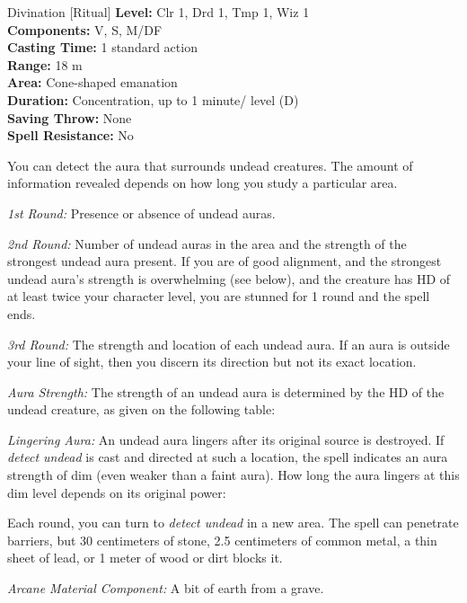 {Divination [Ritual]}
{
	\textbf{Level:}
	Clr 1, Drd 1, Tmp 1, Wiz 1\\
	\textbf{Components:}
	V, S, M/DF\\
	\textbf{Casting Time:}
	1 standard action\\
	\textbf{Range:}
	18 m\\
	\textbf{Area:}
	Cone-shaped emanation\\
	\textbf{Duration:}
	Concentration, up to 1 minute/ level (D)\\
	\textbf{Saving Throw:}
	None\\
	\textbf{Spell Resistance:}
	No\\
}
{
	You can detect the aura that surrounds undead creatures. The amount of information revealed depends on how long you study a particular area.

	\textit{1st Round:}
	Presence or absence of undead auras.

	\textit{2nd Round:}
	Number of undead auras in the area and the strength of the strongest undead aura present. If you are of good alignment, and the strongest undead aura's strength is overwhelming (see below), and the creature has HD of at least twice your character level, you are stunned for 1 round and the spell ends.

	\textit{3rd Round:}
	The strength and location of each undead aura. If an aura is outside your line of sight, then you discern its direction but not its exact location.

	\textit{Aura Strength:}
	The strength of an undead aura is determined by the HD of the undead creature, as given on the following table:


	\textit{Lingering Aura:}
	An undead aura lingers after its original source is destroyed. If \emph{detect undead} is cast and directed at such a location, the spell indicates an aura strength of dim (even weaker than a faint aura). How long the aura lingers at this dim level depends on its original power:


	Each round, you can turn to \emph{detect undead} in a new area. The spell can penetrate barriers, but 30 centimeters of stone, 2.5 centimeters of common metal, a thin sheet of lead, or 1 meter of wood or dirt blocks it.

	\textit{Arcane Material Component:}
	A bit of earth from a grave.

}
